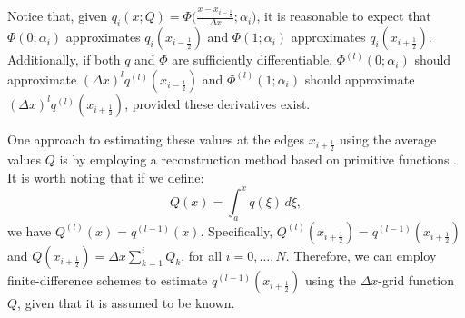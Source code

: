 Notice that, given $q_i(x;Q) = \Phi\big(\frac{x-x_{i-\frac{1}{2}}}{\Delta x};\alpha_i\big)$, 
it is reasonable to expect that $\Phi(0;\alpha_i)$ approximates $q_i(x_{i-\frac{1}{2}})$ and
$\Phi(1;\alpha_i)$ approximates $q_i(x_{i+\frac{1}{2}})$. Additionally, if both $q$ and
$\Phi$ are sufficiently differentiable, $\Phi^{(l)}(0;\alpha_i)$ should approximate
$(\Delta x)^l q^{(l)}(x_{i-\frac{1}{2}})$ and $\Phi^{(l)}(1;\alpha_i)$ should
approximate $(\Delta x)^l q^{(l)}(x_{i+\frac{1}{2}})$, provided these derivatives exist.

One approach to estimating these values at the edges $x_{i+\frac{1}{2}}$ using the average 
values $Q$ is by employing a reconstruction method based on primitive functions \citep[Chapter~17]{leveque:2002}. 
It is worth noting that if we define:
\begin{equation}
	\label{chp-adv1d-sec-recon-ppm-eq5}
	Q(x) = \int_{a}^x q(\xi) \,d\xi,
\end{equation}
we have $Q^{(l)}(x) = q^{(l-1)}(x)$. 
Specifically, $Q^{(l)}(x_{i+\frac{1}{2}}) = q^{(l-1)}(x_{i+\frac{1}{2}})$ and 
$Q(x_{i+\frac{1}{2}}) = \Delta x\sum_{k=1}^i Q_k$, for all $i=0, \ldots, N$.
Therefore, we can employ finite-difference schemes to estimate $q^{(l-1)}(x_{i+\frac{1}{2}})$
using the $\Delta x$-grid function $Q$, given that it is assumed to be known.

